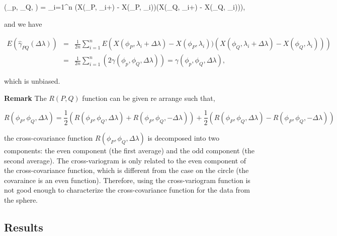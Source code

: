 	\beq
	\hat{\gamma}(\phi_p, \phi_Q, \Delta\lambda) =  \sum_{i=1}^n \left(X(\phi_P, \lambda_i+\Delta \lambda) - X(\phi_P, \lambda_i))(X(\phi_Q, \lambda_i+\Delta \lambda) - X(\phi_Q, \lambda_i))\right),
	\eeq
	
	and we have
	
	
	\begin{eqnarray*}
		E(\hat{\gamma}_{PQ}(\Delta \lambda)) &=& \frac{1}{2n} \sum_{i=1}^n E\left(X(\phi_P, \lambda_i+\Delta \lambda) - X(\phi_P, \lambda_i))(X(\phi_Q, \lambda_i+\Delta \lambda) - X(\phi_Q, \lambda_i))\right) \\
		&=& \frac{1}{2n} \sum_{i=1}^n \left( 2\gamma(\phi_p, \phi_Q, \Delta\lambda) \right) = \gamma(\phi_p, \phi_Q, \Delta\lambda),
	\end{eqnarray*}
	
	which is unbiased. 
	
	{\bf Remark} The $R(P,Q)$ function can be given re arrange such that,  
	
	\[
		R(\phi_P, \phi_Q, \Delta \lambda) = \frac{1}{2}(R(\phi_P, \phi_Q, \Delta \lambda) + R(\phi_P, \phi_Q, -\Delta \lambda))+\frac{1}{2}(R(\phi_P, \phi_Q, \Delta \lambda) - R(\phi_P, \phi_Q, -\Delta \lambda)) 
	\]
	
	the cross-covariance function $R(\phi_P, \phi_Q, \Delta \lambda)$ is decomposed into two components: the even component (the first average) and the odd component (the second average). The cross-variogram is only related to the even component of the cross-covariance function, which is different from the case on the circle (the covaraince is an even function). Therefore, using the cross-variogram function is not good enough to characterize the cross-covariance function for the data from the sphere. 
	
		
	\subsection{Results}
	
	
		
